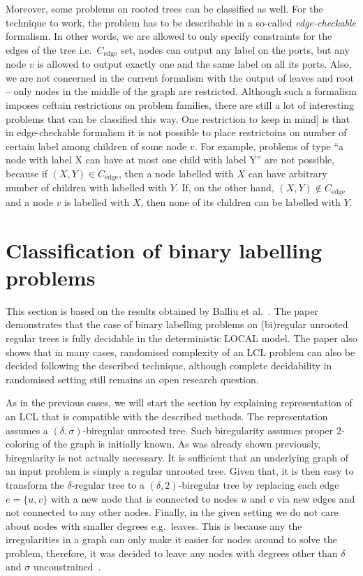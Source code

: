 Moreover, some problems on rooted trees can be classified as well. For the technique to work, the problem
has to be describable in a so-called \emph{edge-checkable} formalism. In other words, we are allowed to
only specify constraints for the edges of the tree i.e.\ $C_{\textrm{edge}}$ set, nodes can output any label
on the ports, but any node $v$ is allowed to output exactly one and the same label on all its ports.
Also, we are not concerned in the current formalism with the output of leaves and root -- only nodes in the
middle of the graph are restricted. Although such a formalism imposes ceftain restrictions on problem families,
there are still a lot of interesting problems that can be classified this way. One restriction to keep in mind]
is that in edge-checkable formalism it is not possible to place restrictoins on number of certain label
among children of some node $v$. For example, problems of type ``a node with label X can have at most one child with label Y''
are not possible, because if $(X, Y) \in C_{\textrm{edge}}$, then a node labelled with $X$ can have arbitrary number of children
with labelled with $Y$. If, on the other hand, $(X, Y) \notin C_{\textrm{edge}}$ and a node $v$ is labelled with $X$, then
none of its children can be labelled with $Y$.

\section{Classification of binary labelling problems}

This section is based on the results obtained by Balliu et al.~\cite{Balliu2019c}. The paper demonstrates
that the case of binary labelling problems on (bi)regular unrooted regular trees is fully decidable in
the deterministic LOCAL model. The paper also shows that in many cases, randomised complexity of an LCL problem
can also be decided following the described technique, although complete decidability in randomised setting
still remains an open research question.

As in the previous cases, we will start the section by explaining representation of an LCL that is compatible
with the described methods. The representation assumes a $(\delta, \sigma)$-biregular unrooted tree.
Such biregularity assumes proper 2-coloring of the graph is initially known.
As was already shown previously, biregularity is not actually necessary. It is
sufficient that an underlying graph of an input problem is simply a regular
unrooted tree. Given that, it is then easy to transform the $\delta$-regular tree
to a $(\delta, 2)$-biregular tree by replacing each edge $e = \{u, v\}$ with a new node that is
connected to nodes $u$ and $v$ via new edges and not connected to any other nodes. Finally,
in the given setting we do not care about nodes with smaller degrees e.g.\ leaves. This is
because any the irregularities in a graph can only make it easier for nodes around to solve
the problem, therefore, it was decided to leave any nodes with degrees other than $\delta$
and $\sigma$ unconstrained~\cite{Balliu2019c}.

